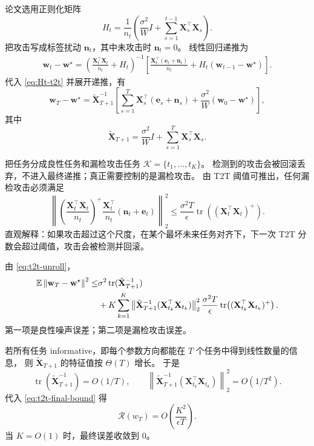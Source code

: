 \documentclass[UTF8,fontset=none,11pt]{ctexart}
\theoremstyle{cnstyle}
\newcommand{\E}{\mathbb{E}}
\newcommand{\tr}{\operatorname{tr}}
\newcommand{\calR}{\mathcal{R}}
\newcommand{\norm}[1]{\left\lVert #1\right\rVert}
\begin{document}
论文选用正则化矩阵
\begin{equation}
  H_t=\frac{1}{n_t}
  \left(
  \frac{\sigma^2}{W}I+\sum_{s=1}^{t-1}\mathbf X_s^\top\mathbf X_s
  \right).
  \label{eq:Ht-t2t}
\end{equation}
把攻击写成标签扰动 \(\mathbf n_t\)，其中未攻击时 \(\mathbf n_t=0\)。
线性回归递推为
\begin{align}
  \mathbf w_t-\mathbf w^\star
  =
  \left(
  \frac{\mathbf X_t^\top\mathbf X_t}{n_t}+H_t
  \right)^{-1}
  \left[
  \frac{\mathbf X_t^\top(\mathbf e_t+\mathbf n_t)}{n_t}
  +H_t(\mathbf w_{t-1}-\mathbf w^\star)
  \right].
  \label{eq:t2t-linear-recursion}
\end{align}
代入 \eqref{eq:Ht-t2t} 并展开递推，有
\begin{equation}
  \mathbf w_T-\mathbf w^\star
  =
  \tilde{\mathbf X}_{T+1}^{-1}
  \left[
  \sum_{s=1}^T\mathbf X_s^\top(\mathbf e_s+\mathbf n_s)
  +\frac{\sigma^2}{W}(\mathbf w_0-\mathbf w^\star)
  \right],
  \label{eq:t2t-unroll}
\end{equation}
其中
\[
  \tilde{\mathbf X}_{T+1}
  =
  \frac{\sigma^2}{W}I+\sum_{s=1}^T\mathbf X_s^\top\mathbf X_s .
\]

把任务分成良性任务和漏检攻击任务 \(\mathcal K=\{t_1,\dots,t_K\}\)。
检测到的攻击会被回滚丢弃，不进入最终递推；真正需要控制的是漏检攻击。
由 T2T 阈值可推出，任何漏检攻击必须满足
\begin{equation}
  \left\|
  \left(
  \frac{\mathbf X_t^\top\mathbf X_t}{n_t}
  \right)^+
  \frac{\mathbf X_t^\top}{n_t}
  (\mathbf n_t+\mathbf e_t)
  \right\|_2^2
  \le
  \frac{\sigma^2T}{\epsilon}
  \tr\!\left((\mathbf X_t^\top\mathbf X_t)^+\right).
  \label{eq:undetected-bound}
\end{equation}
直观解释：如果攻击超过这个尺度，在某个最坏未来任务对齐下，下一次 T2T 分数会超过阈值，攻击会被检测并回滚。

由 \eqref{eq:t2t-unroll}，
\begin{align}
  \E\norm{\mathbf w_T-\mathbf w^\star}^2
  \le&
  \sigma^2\tr(\tilde{\mathbf X}_{T+1}^{-1})
  \notag\\
  &+
  K\sum_{k=1}^K
  \left\|
  \tilde{\mathbf X}_{T+1}^{-1}
  (\mathbf X_{t_k}^\top\mathbf X_{t_k})
  \right\|_2^2
  \frac{\sigma^2T}{\epsilon}
  \tr\!\left((\mathbf X_{t_k}^\top\mathbf X_{t_k})^+\right).
  \label{eq:t2t-final-bound}
\end{align}
第一项是良性噪声误差；第二项是漏检攻击误差。

若所有任务 informative，即每个参数方向都能在 \(T\) 个任务中得到线性数量的信息，
则 \(\tilde{\mathbf X}_{T+1}\) 的特征值按 \(\Theta(T)\) 增长。
于是
\[
  \tr(\tilde{\mathbf X}_{T+1}^{-1})=O(1/T),
  \qquad
  \left\|
  \tilde{\mathbf X}_{T+1}^{-1}
  (\mathbf X_{t_k}^\top\mathbf X_{t_k})
  \right\|_2^2=O(1/T^2).
\]
代入 \eqref{eq:t2t-final-bound} 得
\[
  \calR(w_T)=O\!\left(\frac{K^2}{\epsilon T}\right).
\]
当 \(K=O(1)\) 时，最终误差收敛到 0。
\end{document}
